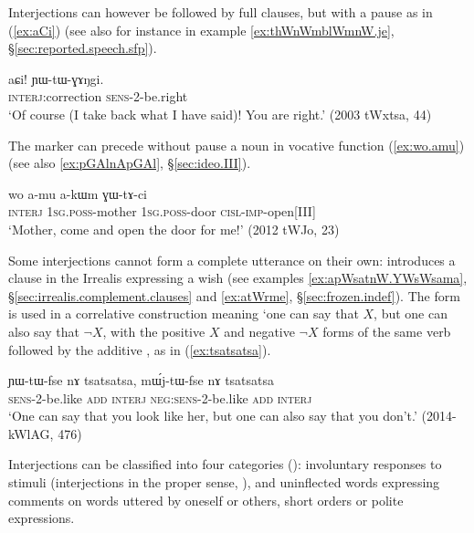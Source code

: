 Interjections can however be followed by full clauses, but with a pause as in (\ref{ex:aCi}) (see also for instance  in example \ref{ex:thWnWmblWmnW.je}, §\ref{sec:reported.speech.sfp}).

\begin{exe}
\ex \label{ex:aCi}
\gll aɕi! ɲɯ-tɯ-ɣɤŋgi.  \\
\textsc{interj}:correction \textsc{sens}-2-be.right \\
\glt `Of course (I take back what I have said)! You are right.' (2003 tWxtsa, 44)
\end{exe} 


The marker  can precede without pause a noun in vocative function (\ref{ex:wo.amu}) (see also \ref{ex:pGAlnApGAl}, §\ref{sec:ideo.III}).
  
\begin{exe}
\ex \label{ex:wo.amu}
\gll wo a-mu a-kɯm ɣɯ-tɤ-ci  \\
\textsc{interj} \textsc{1sg}.\textsc{poss}-mother  \textsc{1sg}.\textsc{poss}-door \textsc{cisl}-\textsc{imp}-open[III] \\
\glt `Mother, come and open the door for me!' (2012 tWJo, 23)
\end{exe} 

Some interjections cannot form a complete utterance on their own:   introduces a clause in the Irrealis expressing a wish (see examples \ref{ex:apWsatnW.YWsWsama}, §\ref {sec:irrealis.complement.clauses} and \ref{ex:atWrme}, §\ref{sec:frozen.indef}). The form  is used in a correlative construction meaning  `one can say that $X$, but one can also say that $\neg X$, with the positive $X$ and negative $\neg X$ forms of the same verb followed by the additive , as in (\ref{ex:tsatsatsa}).

\begin{exe}
\ex \label{ex:tsatsatsa}
\gll ɲɯ-tɯ-fse nɤ tsatsatsa, mɯ́j-tɯ-fse nɤ tsatsatsa \\
\textsc{sens}-2-be.like \textsc{add} \textsc{interj} \textsc{neg}:\textsc{sens}-2-be.like \textsc{add} \textsc{interj} \\
\glt  `One can say that you look like her, but one can also say that you don't.' (2014-kWlAG, 476)
\end{exe}



Interjections can be classified into four categories (): involuntary responses to stimuli (interjections in the proper sense, \citealt{dingemanse11phd}), and uninflected words expressing comments on words uttered by oneself or others, short orders or polite expressions.
  
